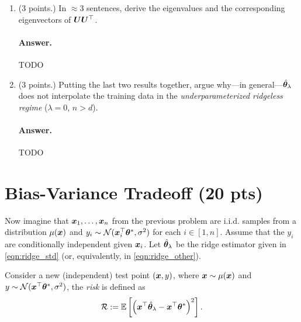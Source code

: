 \documentclass[11pt,letterpaper]{article}
\newenvironment{answer}{%
    \vspace{1em}
    \color{black}
    \paragraph{Answer.}
  }{%
    \vspace{1em}
  }
\begin{document}
\begin{enumerate}
  \item (3 points.)
    In $\approx 3$ sentences, derive the eigenvalues and the corresponding eigenvectors of ${\bm{U}} {\bm{U}}^\top$.

\begin{answer}
  TODO
\end{answer}

  \item (3 points.)
    Putting the last two results together,
    argue why---in general---$\hat{{\bm{\theta}}}_\lambda$ does not interpolate the training data in the \emph{underparameterized ridgeless regime}
    ($\lambda = 0$, $n > d$).

\begin{answer}
  TODO
\end{answer}

\end{enumerate}



\section{Bias-Variance Tradeoff (20 pts)}

Now imagine that ${\bm{x}}_1, \ldots, {\bm{x}}_n$ from the previous problem are i.i.d. samples from a distribution $\mu({\bm{x}})$
and $y_i \sim \mathcal{N}({\bm{x}}_i^\top {\bm{\theta}}^*, \sigma^2)$ for each $i \in [1, n]$.
Assume that the $y_i$ are conditionally independent given ${\bm{x}}_i$.
Let $\hat{{\bm{\theta}}}_\lambda$ be the ridge estimator given in \cref{eqn:ridge_std} (or, equivalently, in \cref{eqn:ridge_other}).

Consider a new (independent) test point $({\bm{x}}, y)$, where ${\bm{x}} \sim \mu({\bm{x}})$ and $y \sim \mathcal{N}({\bm{x}}^\top {\bm{\theta}}^*, \sigma^2)$,
the \emph{risk} is defined as
%
\[
  \mathcal{R} := \mathbb{E} \left[ \left( {\bm{x}}^\top \hat{{\bm{\theta}}}_\lambda - {\bm{x}}^\top {\bm{\theta}}^* \right)^2 \right].
\]
\end{document}
